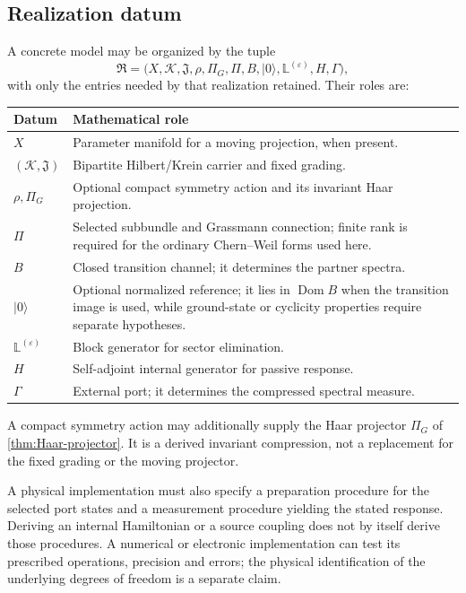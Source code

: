 \documentclass[11pt,reqno]{scrartcl}
\newcommand{\scrK}{\mathscr K}
\newcommand{\fundJ}{\mathfrak J}
\newcommand{\ket}[1]{\lvert #1\rangle}
\DeclareMathOperator{\Dom}{Dom}
\theoremstyle{plain}
\theoremstyle{definition}
\theoremstyle{remark}
\begin{document}
\subsection{Realization datum}

A concrete model may be organized by the tuple
\begin{equation}
  \mathfrak R
  =\bigl(
    X,\scrK,\fundJ,\rho,\Pi_G,\Pi,B,\ket0,
    \mathbb L^{(\varepsilon)},H,\Gamma
   \bigr),
  \label{eq:realization-datum}
\end{equation}
with only the entries needed by that realization retained.  Their roles are:
\begin{center}
\small
\begin{tabularx}{\textwidth}{>{\raggedright\arraybackslash}p{} X}
\toprule
\textbf{Datum} & \textbf{Mathematical role} \\
\midrule
\(X\) & Parameter manifold for a moving projection, when present. \\
\((\scrK,\fundJ)\) & Bipartite Hilbert/Krein carrier and fixed grading. \\
\(\rho,\Pi_G\) & Optional compact symmetry action and its invariant Haar projection. \\
\(\Pi\) & Selected subbundle and Grassmann connection; finite rank is required for the ordinary Chern--Weil forms used here. \\
\(B\) & Closed transition channel; it determines the partner spectra. \\
\(\ket0\) & Optional normalized reference; it lies in \(\Dom B\) when the transition image is used, while ground-state or cyclicity properties require separate hypotheses. \\
\(\mathbb L^{(\varepsilon)}\) & Block generator for sector elimination. \\
\(H\) & Self-adjoint internal generator for passive response. \\
\(\Gamma\) & External port; it determines the compressed spectral measure. \\
\bottomrule
\end{tabularx}
\end{center}

A compact symmetry action may additionally supply the Haar projector
\(\Pi_G\) of \cref{thm:Haar-projector}.  It is a derived invariant
compression, not a replacement for the fixed grading or the moving projector.

A physical implementation must also specify a preparation procedure
for the selected port states and a measurement procedure yielding the
stated response.  Deriving an internal Hamiltonian or a source coupling
does not by itself derive those procedures.  A numerical or electronic
implementation can test its prescribed operations, precision and errors;
the physical identification of the underlying degrees of freedom is a
separate claim.
\end{document}
